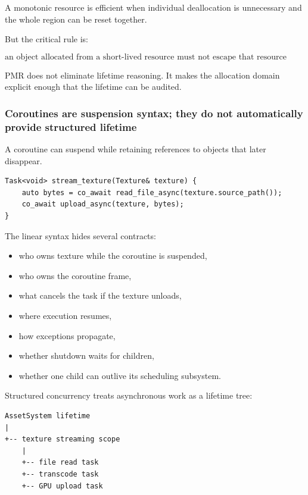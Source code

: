A monotonic resource is efficient when individual deallocation is unnecessary and the whole region can be reset together.

But the critical rule is:

\[
\boxed{
\text{an object allocated from a short-lived resource must not escape that resource lifetime}
}
\]

PMR does not eliminate lifetime reasoning. It makes the allocation domain explicit enough that the lifetime can be audited.

\subsubsection{Coroutines are suspension syntax; they do not automatically provide structured lifetime}\label{01-foundations-i-ch005-coroutines-are-suspension-syntax-they-do-not-automatically-provide-structured-lifetime}

\hypertarget{01-foundations-i-ch005-coroutines-are-suspension-syntax-they-do-not-automatically-provide-structured-lifetime}{}

A coroutine can suspend while retaining references to objects that later disappear.

\begin{verbatim}
Task<void> stream_texture(Texture& texture) {
    auto bytes = co_await read_file_async(texture.source_path());
    co_await upload_async(texture, bytes);
}
\end{verbatim}

The linear syntax hides several contracts:

\begin{itemize}
\tightlist
\item
  who owns texture while the coroutine is suspended,
\item
  who owns the coroutine frame,
\item
  what cancels the task if the texture unloads,
\item
  where execution resumes,
\item
  how exceptions propagate,
\item
  whether shutdown waits for children,
\item
  whether one child can outlive its scheduling subsystem.
\end{itemize}

Structured concurrency treats asynchronous work as a lifetime tree:

\begin{verbatim}
AssetSystem lifetime
|
+-- texture streaming scope
    |
    +-- file read task
    +-- transcode task
    +-- GPU upload task
\end{verbatim}


